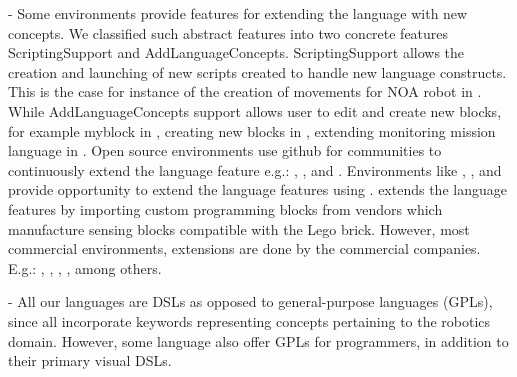 


\parhead{\fextensibility} -
Some environments provide features for extending the language with new concepts. We classified such abstract features into two concrete features ScriptingSupport and AddLanguageConcepts. %
ScriptingSupport allows the creation and launching of new scripts created to handle new language constructs. This is the case for instance of the creation of  movements for NOA robot in \choregraphe.
 While AddLanguageConcepts support allows user to edit and create new blocks, for example myblock in \makeblock, creating new blocks in \tivipe, extending monitoring mission language in \flyaq.   Open source environments use github for communities to continuously extend the language feature e.g.: \sphero, \openroberta, and \flyaq. Environments like \easyc, \flyaq, and \missionlab provide opportunity to extend the language features using . 
\lego extends the language features by importing custom programming blocks from vendors which manufacture sensing blocks compatible with the Lego brick. However, most commercial environments, extensions  are done by the commercial companies. E.g.: \arcbotics, \edison, \blocklyprop, \vex, \robotmesh among others.

\parhead{\flangparadigm} - All our languages are DSLs as opposed to general-purpose languages (GPLs), since all incorporate keywords representing concepts pertaining to the robotics domain. However, some language also offer GPLs for programmers, in addition to their primary visual DSLs.



